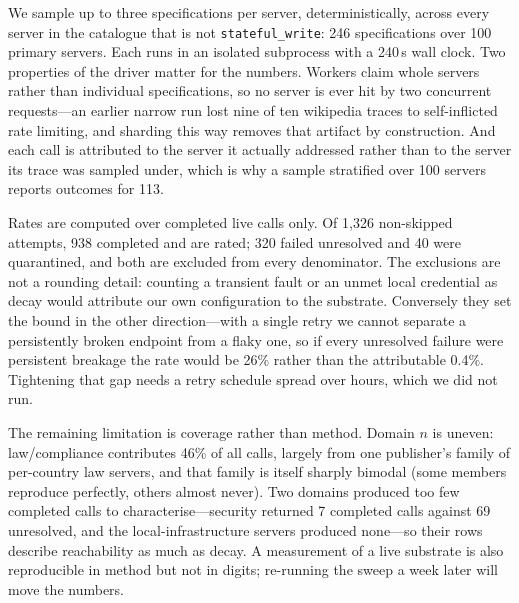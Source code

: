 We sample up to three specifications per server, deterministically, across every
server in the catalogue that is not \texttt{stateful\_write}: 246
specifications over 100 primary servers. Each runs in an isolated subprocess
with a 240\,s wall clock. Two properties of the driver matter for the numbers.
Workers claim whole servers rather than individual specifications, so no server
is ever hit by two concurrent requests---an earlier narrow run lost nine of ten
wikipedia traces to self-inflicted rate limiting, and sharding this way removes
that artifact by construction. And each call is attributed to the server it
actually addressed rather than to the server its trace was sampled under, which
is why a sample stratified over 100 servers reports outcomes for 113.

Rates are computed over completed live calls only. Of 1{,}326 non-skipped
attempts, 938 completed and are rated; 320 failed unresolved and 40 were
quarantined, and both are excluded from every denominator. The exclusions are
not a rounding detail: counting a transient fault or an unmet local credential
as decay would attribute our own configuration to the substrate. Conversely they
set the bound in the other direction---with a single retry we cannot separate a
persistently broken endpoint from a flaky one, so if every unresolved failure
were persistent breakage the rate would be 26\% rather than the attributable
0.4\%. Tightening that gap needs a retry schedule spread over hours, which we
did not run.

The remaining limitation is coverage rather than method. Domain $n$ is uneven:
law/compliance contributes 46\% of all calls, largely from one publisher's
family of per-country law servers, and that family is itself sharply bimodal
(some members reproduce perfectly, others almost never). Two domains produced
too few completed calls to characterise---security returned 7 completed calls
against 69 unresolved, and the local-infrastructure servers produced none---so
their rows describe reachability as much as decay. A measurement of a live
substrate is also reproducible in method but not in digits; re-running the sweep
a week later will move the numbers.

